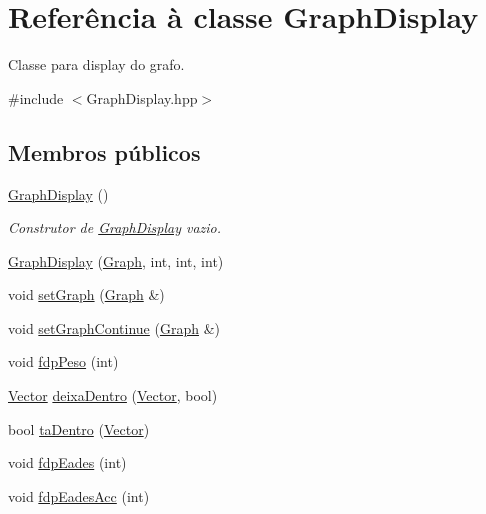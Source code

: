 \hypertarget{classGraphDisplay}{}\section{Referência à classe Graph\+Display}
\label{classGraphDisplay}


Classe para display do grafo.  




{\ttfamily \#include $<$Graph\+Display.\+hpp$>$}

\subsection*{Membros públicos}
\begin{DoxyCompactItemize}
\item 
\mbox{\label{classGraphDisplay_ac208e50545ccedbca810822743040f48}} 
\hyperlink{classGraphDisplay_ac208e50545ccedbca810822743040f48}{Graph\+Display} ()
\begin{DoxyCompactList}\small\item\em Construtor de \hyperlink{classGraphDisplay}{Graph\+Display} vazio. \end{DoxyCompactList}\item 
\hyperlink{classGraphDisplay_adea7ab840d8aa0646eab49709569143f}{Graph\+Display} (\hyperlink{classGraph}{Graph}, int, int, int)
\item 
void \hyperlink{classGraphDisplay_a496ee74caea737ce5f93f9d23474eb6d}{set\+Graph} (\hyperlink{classGraph}{Graph} \&)
\item 
void \hyperlink{classGraphDisplay_ab90cdfe3694a8a34767dc50268cf5a50}{set\+Graph\+Continue} (\hyperlink{classGraph}{Graph} \&)
\item 
void \hyperlink{classGraphDisplay_a9d55e916fea8b749eaee51def8d004d3}{fdp\+Peso} (int)
\item 
\hyperlink{classVector}{Vector} \hyperlink{classGraphDisplay_a694d361743f700a6250d578978aefab1}{deixa\+Dentro} (\hyperlink{classVector}{Vector}, bool)
\item 
bool \hyperlink{classGraphDisplay_a6d822244f05f8a0dd1e40a40d13294bf}{ta\+Dentro} (\hyperlink{classVector}{Vector})
\item 
void \hyperlink{classGraphDisplay_af709c8e4e8c0e270dbe5edcab2c8e350}{fdp\+Eades} (int)
\item 
void \hyperlink{classGraphDisplay_a982c8bb3e300720840a6e1fbd877f5ba}{fdp\+Eades\+Acc} (int)
\item 

\end{DoxyCompactItemize}

